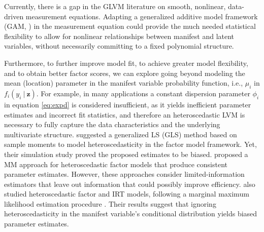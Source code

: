 \documentclass[11pt, a4paper]{article}
\newcommand{\cond}{\!~|~\!}
\begin{document}


Currently, there is a gap in the GLVM literature on smooth, nonlinear, data-driven measurement equations. Adapting a generalized additive model framework (GAM, \citealp{HT1990}) in the measurement equation could provide the much needed statistical flexibility to allow for nonlinear relationships between manifest and latent variables, without necessarily committing to a fixed polynomial structure.

Furthermore, to further improve model fit, to achieve greater model flexibility, and to obtain better factor scores, we can explore going beyond modeling the mean (location) parameter in the manifest variable probability function, i.e., $\mu_i$ in $f_i(y_i\cond\mathbf{z})$. For example, in many applications a constant dispersion parameter $\phi_i$ in equation \eqref{eq:expd} is considered insufficient, as it yields inefficient parameter estimates and incorrect fit statistics, and therefore an heteroscedastic LVM is necessary to fully capture the data characteristics and the underlying multivariate structure. \citet{Meijer&Mooijart_BJMSP1996} suggested a generalized LS (GLS) method based on sample moments to model heteroscedasticity in the factor model framework. Yet, their simulation study proved the proposed estimates to be biased. \citet{LewinKoh&Amemiya_Biometrika2003} proposed a MM approach for heteroscedastic factor models that produce consistent parameter estimates. However, these approaches consider limited-information estimators that leave out information that could possibly improve efficiency. \citet{Hessen&Dolan_BJMSP2009, MolenaarEtAl_Psychometrika2012, Molenaar_Psychometrika2015} also studied heteroscedastic factor and IRT models, following a marginal maximum likelihood estimation procedure \citep{Bock&Aitkin_Psychometrika1981}. Their results suggest that ignoring heteroscedasticity in the manifest variable's conditional distribution yields biased parameter estimates.
\end{document}
